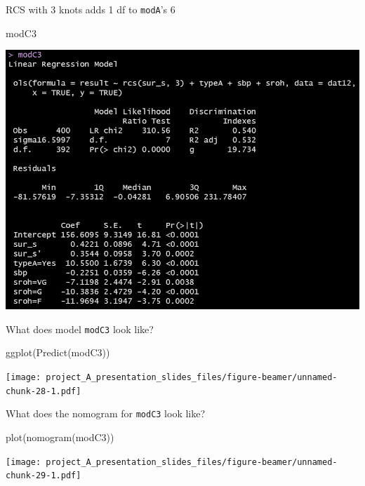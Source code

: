 \documentclass[
  ignorenonframetext,
]{beamer}
\newenvironment{Shaded}{\begin{snugshade}}{\end{snugshade}}
\newcommand{\FunctionTok}[1]{\textcolor[rgb]{0.00,0.00,0.00}{#1}}
\newcommand{\NormalTok}[1]{#1}
\begin{document}
\begin{frame}[fragile]{RCS with 3 knots adds 1 df to \texttt{modA}'s 6}
\protect\hypertarget{rcs-with-3-knots-adds-1-df-to-modas-6}{}
\begin{Shaded}
\begin{Highlighting}[]
\NormalTok{modC3}
\end{Highlighting}
\end{Shaded}

\begin{center}\includegraphics[width=12.43in,height=0.65\textheight]{figures/small4} \end{center}
\end{frame}

\begin{frame}[fragile]{What does model \texttt{modC3} look like?}
\protect\hypertarget{what-does-model-modc3-look-like}{}
\begin{Shaded}
\begin{Highlighting}[]
\FunctionTok{ggplot}\NormalTok{(}\FunctionTok{Predict}\NormalTok{(modC3))}
\end{Highlighting}
\end{Shaded}

\texttt{[image: project\_A\_presentation\_slides\_files/figure-beamer/unnamed-chunk-28-1.pdf]}
\end{frame}

\begin{frame}[fragile]{What does the nomogram for \texttt{modC3} look
like?}
\protect\hypertarget{what-does-the-nomogram-for-modc3-look-like}{}
\begin{Shaded}
\begin{Highlighting}[]
\FunctionTok{plot}\NormalTok{(}\FunctionTok{nomogram}\NormalTok{(modC3))}
\end{Highlighting}
\end{Shaded}

\texttt{[image: project\_A\_presentation\_slides\_files/figure-beamer/unnamed-chunk-29-1.pdf]}
\end{frame}
\end{document}

